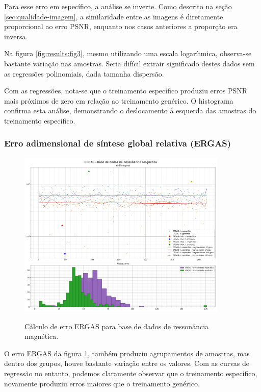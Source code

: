 Para esse erro em específico, a análise se inverte. Como descrito na seção \ref{sec:qualidade-imagem}, a similaridade entre as imagens é diretamente proporcional ao erro PSNR, enquanto nos casos anteriores a proporção era inversa.

Na figura \ref{fig:results:fig3}, mesmo utilizando uma escala logarítmica, observa-se bastante variação nas amostras. Seria difícil extrair significado destes dados sem as regressões polinomiais, dada tamanha dispersão. 

Com as regressões, nota-se que o treinamento específico produziu erros PSNR mais próximos de zero em relação ao treinamento genérico. O histograma confirma esta análise, demonstrando o deslocamento à esquerda das amostras do treinamento específico.

\subsubsection{Erro adimensional de síntese global relativa (ERGAS)}
\label{sec:result:mri:ergas}

\begin{figure}[H]
    \centering
    \caption{Cálculo de erro ERGAS para base de dados de ressonância magnética.}
    \includegraphics[width=10cm]{fig/resultados/mri/png/ergas_mri_compound.png}
    \label{fig:results:fig4}
\end{figure}

O erro ERGAS da figura \ref{fig:results:fig4}, também produziu agrupamentos de amostras, mas dentro dos grupos, houve bastante variação entre os valores. Com as curvas de regressão no entanto, podemos claramente observar que o treinamento específico, novamente produziu erros maiores que o treinamento genérico. 

